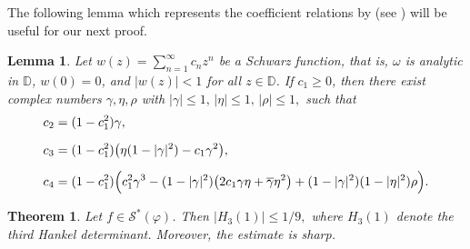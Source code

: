 \documentclass[a4paper,12pt,reqno]{amsart} %
\numberwithin{equation}{section}
\newtheorem{thm}{Theorem}[section]
\newtheorem{lem}{Lemma}[section]
\theoremstyle{definition}
\begin{document}
The following lemma which represents the coefficient relations by (see \cite{ KwonLeckoSim2018, LiberaZlotkiewicz1982})  will be useful for our next proof.
\begin{lem}\label{lem:schwarz-param}
Let
$
w(z)=\sum_{n=1}^{\infty}c_n z^n
$
be a Schwarz function, that is, $\omega$ is analytic in $\mathbb D$,
$w(0)=0$, and $|w(z)|<1$ for all $z\in\mathbb D$.
If $c_1\ge 0$, then there exist complex numbers $\gamma,\eta,\rho$
with
$
|\gamma|\le 1,\, |\eta|\le 1,\, |\rho|\le 1,
$
such that
\begin{align*}
c_2 &= (1-c_1^2)\gamma,\\[2mm]
c_3 &= (1-c_1^2)\bigl(\eta(1-|\gamma|^2)-c_1\gamma^2\bigr),\\[2mm]
c_4 &= (1-c_1^2)\Bigl(
c_1^2\gamma^3
-(1-|\gamma|^2)\bigl(2c_1\gamma\eta+\overline{\gamma}\eta^2\bigr)
+(1-|\gamma|^2)(1-|\eta|^2)\rho
\Bigr).
\end{align*}
\end{lem}
\begin{thm}\label{thm:H3-1}
Let $f\in \mathcal{S}^*(\varphi)$. Then
$
|H_3(1)|\leq {1}/{9},
$
where $H_3(1)$ denote the third Hankel determinant. Moreover, the estimate is sharp.
\end{thm}
\end{document}
